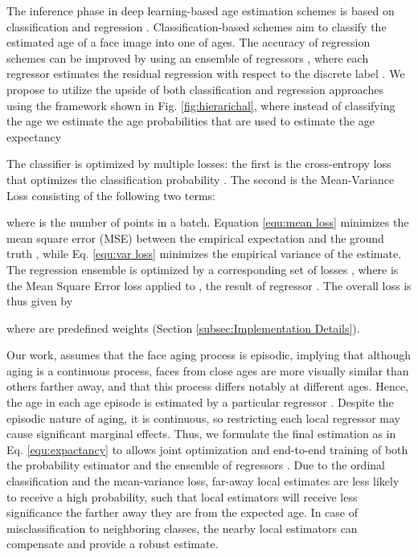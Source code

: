 \documentclass[10pt,journal]{IEEEtran}\usepackage{amsfonts}
\begin{document}
The inference phase in deep learning-based age estimation schemes is based on
classification \cite{leviage} and regression \cite{8099569, 7780901, 9145576,
coral}. Classification-based schemes aim to classify the estimated age  of
a face image into one of  ages. The
accuracy of regression schemes can be improved by using an ensemble of
regressors  \cite{8954134, 8578343}, where each regressor  estimates the residual regression with respect to
the discrete label . We propose to utilize the upside of both
classification and regression approaches using the framework shown in Fig.
\ref{fig:hierarichal}, where instead of classifying the age  we estimate the age
probabilities  that are used to
estimate the age expectancy



The classifier is optimized by multiple losses: the first is the cross-entropy
loss  that optimizes the classification probability . The second is the Mean-Variance Loss
\cite{Mean-Variance} consisting of the following two terms:




where  is the number of points in a batch. Equation \ref{equ:mean loss}
minimizes the mean square error (MSE) between the empirical expectation and
the ground truth , while Eq. \ref{equ:var loss} minimizes the
empirical variance of the estimate. The regression ensemble  is optimized by a
corresponding set of  losses ,
where  is the Mean Square Error loss applied to , the result of regressor . The overall loss is thus given by

where  are predefined weights
(Section \ref{subsec:Implementation Details}).

Our work, assumes that the face aging process is episodic, implying that
although aging is a continuous process, faces from close ages are more
visually similar than others farther away, and that this process differs
notably at different ages. Hence, the age in each age episode  is estimated
by a particular regressor . Despite
the episodic nature of aging, it is continuous, so restricting each local
regressor  may cause significant
marginal effects. Thus, we formulate the final estimation as in Eq.
\ref{equ:expactancy} to allows joint optimization and end-to-end training of
both the probability estimator and the ensemble of regressors . Due to the
ordinal classification and the mean-variance loss, far-away local estimates
are less likely to receive a high probability, such that local estimators will
receive less significance the farther away they are from the expected age. In
case of misclassification to neighboring classes, the nearby local estimators
can compensate and provide a robust estimate.
\end{document}
